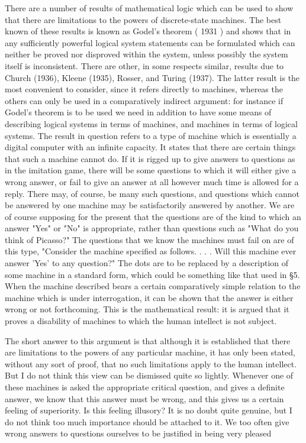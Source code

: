 \documentclass{article}
\begin{document}
There are a number of results of mathematical logic which can be used to show that there are limitations to the powers of discrete-state machines. The best known of these results is known as Godel's theorem ( 1931 ) and shows that in any sufficiently powerful logical system statements can be formulated which can neither be proved nor disproved within the system, unless possibly the system itself is inconsistent. There are other, in some respects similar, results due to Church (1936), Kleene (1935), Rosser, and Turing (1937). The latter result is the most convenient to consider, since it refers directly to machines, whereas the others can only be used in a comparatively indirect argument: for instance if Godel's theorem is to be used we need in addition to have some means of describing logical systems in terms of machines, and machines in terms of logical systems. The result in question refers to a type of machine which is essentially a digital computer with an infinite capacity. It states that there are certain things that such a machine cannot do. If it is rigged up to give answers to questions as in the imitation game, there will be some questions to which it will either give a wrong answer, or fail to give an answer at all however much time is allowed for a reply. There may, of course, be many such questions, and questions which cannot be answered by one machine may be satisfactorily answered by another. We are of course supposing for the present that the questions are of the kind to which an answer "Yes" or "No" is appropriate, rather than questions such as "What do you think of Picasso?" The questions that we know the machines must fail on are of this type, "Consider the machine specified as follows. . . . Will this machine ever answer 'Yes' to any question?" The dots are to be replaced by a description of some machine in a standard form, which could be something like that used in \S5. When the machine described bears a certain comparatively simple relation to the machine which is under interrogation, it can be shown that the answer is either wrong or not forthcoming. This is the mathematical result: it is argued that it proves a disability of machines to which the human intellect is not subject.

The short answer to this argument is that although it is established that there are limitations to the powers of any particular machine, it has only been stated, without any sort of proof, that no such limitations apply to the human intellect. But I do not think this view can be dismissed quite so lightly. Whenever one of these machines is asked the appropriate critical question, and gives a definite answer, we know that this answer must be wrong, and this gives us a certain feeling of superiority. Is this feeling illusory? It is no doubt quite genuine, but I do not think too much importance should be attached to it. We too often give wrong answers to questions ourselves to be justified in being very pleased
\end{document}
